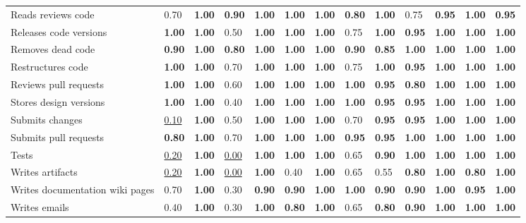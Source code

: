 \begin{tabular}{lllllllllllll}
Reads reviews code & 0.70 & \textbf{1.00} & \textbf{0.90} & \textbf{1.00} & \textbf{1.00} & \textbf{1.00} & \textbf{0.80} & \textbf{1.00} & 0.75 & \textbf{0.95} & \textbf{1.00} & \textbf{0.95} \\
Releases code versions & \textbf{1.00} & \textbf{1.00} & 0.50 & \textbf{1.00} & \textbf{1.00} & \textbf{1.00} & 0.75 & \textbf{1.00} & \textbf{0.95} & \textbf{1.00} & \textbf{1.00} & \textbf{1.00} \\
Removes dead code & \textbf{0.90} & \textbf{1.00} & \textbf{0.80} & \textbf{1.00} & \textbf{1.00} & \textbf{1.00} & \textbf{0.90} & \textbf{0.85} & \textbf{1.00} & \textbf{1.00} & \textbf{1.00} & \textbf{1.00} \\
Restructures code & \textbf{1.00} & \textbf{1.00} & 0.70 & \textbf{1.00} & \textbf{1.00} & \textbf{1.00} & 0.75 & \textbf{1.00} & \textbf{0.95} & \textbf{1.00} & \textbf{1.00} & \textbf{1.00} \\
Reviews pull requests & \textbf{1.00} & \textbf{1.00} & 0.60 & \textbf{1.00} & \textbf{1.00} & \textbf{1.00} & \textbf{1.00} & \textbf{0.95} & \textbf{0.80} & \textbf{1.00} & \textbf{1.00} & \textbf{1.00} \\
Stores design versions & \textbf{1.00} & \textbf{1.00} & 0.40 & \textbf{1.00} & \textbf{1.00} & \textbf{1.00} & \textbf{1.00} & \textbf{0.95} & \textbf{0.95} & \textbf{1.00} & \textbf{1.00} & \textbf{1.00} \\
Submits changes & \underline{0.10} & \textbf{1.00} & 0.50 & \textbf{1.00} & \textbf{1.00} & \textbf{1.00} & 0.70 & \textbf{0.95} & \textbf{0.95} & \textbf{1.00} & \textbf{1.00} & \textbf{1.00} \\
Submits pull requests & \textbf{0.80} & \textbf{1.00} & 0.70 & \textbf{1.00} & \textbf{1.00} & \textbf{1.00} & \textbf{0.95} & \textbf{0.95} & \textbf{1.00} & \textbf{1.00} & \textbf{1.00} & \textbf{1.00} \\
Tests & \underline{0.20} & \textbf{1.00} & \underline{0.00} & \textbf{1.00} & \textbf{1.00} & \textbf{1.00} & 0.65 & \textbf{0.90} & \textbf{1.00} & \textbf{1.00} & \textbf{1.00} & \textbf{1.00} \\
Writes artifacts & \underline{0.20} & \textbf{1.00} & \underline{0.00} & \textbf{1.00} & 0.40 & \textbf{1.00} & 0.65 & 0.55 & \textbf{0.80} & \textbf{1.00} & \textbf{0.80} & \textbf{1.00} \\
Writes documentation wiki pages & 0.70 & \textbf{1.00} & 0.30 & \textbf{0.90} & \textbf{0.90} & \textbf{1.00} & \textbf{1.00} & \textbf{0.90} & \textbf{0.90} & \textbf{1.00} & \textbf{0.95} & \textbf{1.00} \\
Writes emails & 0.40 & \textbf{1.00} & 0.30 & \textbf{1.00} & \textbf{0.80} & \textbf{1.00} & 0.65 & \textbf{0.80} & \textbf{0.90} & \textbf{1.00} & \textbf{1.00} & \textbf{1.00} \\
\bottomrule
\end{tabular}
